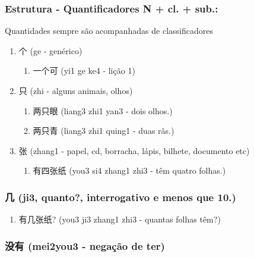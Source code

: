 \documentclass[11pt]{article}
\begin{document}
\subsubsection{Estrutura - Quantificadores N + cl. + sub.:}
\label{sec:orgaaf8250}
Quantidades sempre são acompanhadas de classificadores
\begin{enumerate}
\item 个 (ge - genérico)
\label{sec:org4a83173}
\begin{enumerate}
\item 一个可 (yi1 ge ke4 - lição 1)
\end{enumerate}

\item 只 (zhi - alguns animais, olhos)
\label{sec:org10458c6}
\begin{enumerate}
\item 两只眼 (liang3 zhi1 yan3 - dois olhos.)
\item 两只青 (liang3 zhi1 quing1 - duas rãs.)
\end{enumerate}

\item 张 (zhang1 - papel, cd, borracha, lápis, bilhete, documento etc)
\label{sec:org1afe6bd}
\begin{enumerate}
\item 有四张纸 (you3 si4 zhang1 zhi3 - têm quatro folhas.)
\end{enumerate}
\end{enumerate}

\subsubsection{几 (ji3, quanto?, interrogativo e menos que 10.)}
\label{sec:orgba1555d}
\begin{enumerate}
\item 有几张纸? (you3 ji3 zhang1 zhi3 - quantas folhas têm?)
\end{enumerate}

\subsubsection{没有 (mei2you3 - negação de ter)}
\label{sec:org91ddc97}
\end{document}
